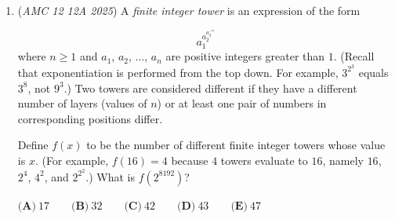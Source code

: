 \begin{enumerate}
	\item (\textit{AMC 12 12A 2025}) A \textit{finite integer tower} is an expression of the form

 \[a_{1}^{a_{2}^{a_{3}^{\iddots^{a_{n}}}}}\]
where $n \geq 1$ and $a_{1}$, $a_2$, $\dots$, $a_{n}$ are positive integers greater than $1$. (Recall that exponentiation is performed from the top down. For example, $3^{2^{3}}$ equals $3^{8}$, not $9^{3}$.) Two towers are considered different if they have a different number of layers (values of $n$) or at least one pair of numbers in corresponding positions differ.


 Define $f(x)$ to be the number of different finite integer towers whose value is $x$. (For example, $f(16)=4$ because $4$ towers evaluate to $16$, namely $16$, $2^{4}$, $4^2$, and $2^{2^{2}}$.) What is $f(2^{8192})$?


 $\textbf{(A)}\   17  \qquad                 \textbf{(B)}\   32  \qquad                 \textbf{(C)}\   42  \qquad                 \textbf{(D)}\   43  \qquad                 \textbf{(E)}\   47$


\end{enumerate}